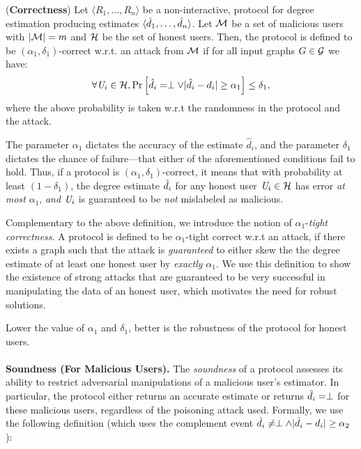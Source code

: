 \begin{defn}\label{chap4-def:correct}(\textbf{Correctness}) Let 
  $\langle R_1, \ldots, R_n\rangle$ be a non-interactive, \ldp{} protocol for degree estimation producing estimates $\langle \hat{d}_1, \ldots, \hat{d}_n\rangle$. Let $\mathcal{M}$ be a set of malicious users with $|\mathcal{M}| = m$ and $\mathcal{H}$ be the set of honest users. 
Then, the protocol is defined to be $(\alpha_1,\delta_1)$-correct w.r.t. an attack from $\mathcal{M}$ if for all input graphs $G\in \mathcal{G}$ we have:
  \begin{gather}    
    \forall \textit{U}_i \in \mathcal{H}, \mathrm{Pr}\left[\hat{d}_i = \perp \vee
    |\hat{d}_i-d_i|\geq \alpha_1\right]\leq \delta_1,\label{chap4-eq:correct1}
  \end{gather}
where the above probability is taken w.r.t  the randomness in the protocol and the attack.
\end{defn}
The parameter $\alpha_1$ dictates the accuracy of the estimate $\hat{d}_i$, and the parameter $\delta_1$ dictates the chance of failure---that either of the aforementioned conditions fail to hold. Thus, if a protocol is $(\alpha_1,\delta_1)$-correct, it means that with probability at least $(1-\delta_1)$, 
the degree estimate $\hat{d}_i$ for any honest user $\textit{U}_i \in \mathcal{H}$ has error \textit{at most} $\alpha_1$, \textit{and} $\textit{U}_i$ is guaranteed to be \textit{not} mislabeled as malicious.

Complementary to the above definition, we introduce the notion of $\alpha_1$-\textit{tight correctness}. A protocol is defined to be $\alpha_1$-tight correct w.r.t an attack, if there exists a graph such that the attack is \textit{guaranteed} to either skew the  the degree estimate of at least one honest user by \textit{exactly} $\alpha_1$.  We use this definition to show the existence of strong attacks that are guaranteed to be very successful in manipulating the data of an honest user, which motivates the need for robust solutions. 

Lower the value of
$\alpha_1$ and $\delta_1$, better is the robustness of the protocol for honest users.    \\\\ 
\noindent\textbf{Soundness (For Malicious Users). } The \textit{soundness} of a protocol assesses its ability to restrict adversarial manipulations of a malicious user's estimator. In particular, the protocol either returns an accurate estimate or returns $\hat{d}_i = \perp$ for these malicious users, regardless of the poisoning attack used. Formally, we use the following definition (which uses the complement event $\hat{d}_i \neq \perp \wedge |\hat{d}_i - d_i| \geq \alpha_2$):

